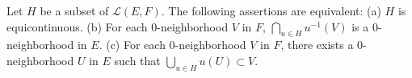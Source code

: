 Let $H$ be a subset of $\mathcal{L}(E, F)$. The following assertions are equivalent: (a) $H$ is equicontinuous. (b) For each 0-neighborhood $V$ in $F$, $\bigcap_{u \in H} u^{-1}(V)$ is a 0-neighborhood in $E$. (c) For each 0-neighborhood $V$ in $F$, there exists a 0-neighborhood $U$ in $E$ such that $\bigcup_{u \in H} u(U) \subset V$.
